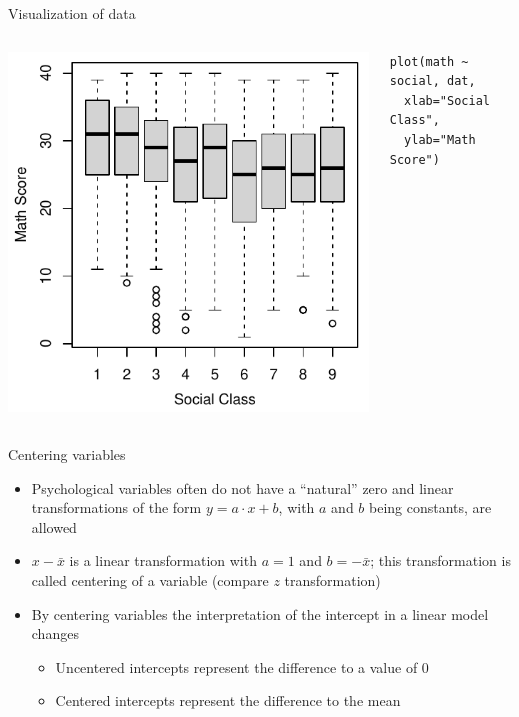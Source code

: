 \documentclass{beamer}
\begin{document}
\begin{frame}[fragile]{Visualization of data}
  \begin{columns}
    \begin{column}{6cm}
      \includegraphics[scale=.8]{../figures/jsp_box1}
    \end{column}
    \begin{column}{4cm}
      \begin{lstlisting}[style=plain]
plot(math ~ social, dat,
  xlab="Social Class",
  ylab="Math Score")
      \end{lstlisting}
    \end{column}
  \end{columns}
\end{frame}

\begin{frame}[fragile]{Centering variables}
  \begin{itemize}
    \item Psychological variables often do not have a ``natural'' zero and
      linear transformations of the form $y = a\cdot x + b$, with $a$ and
      $b$ being constants, are allowed
    \item $x - \bar x$ is a linear transformation with $a = 1$ and $b =
      -\bar x$; this transformation is called centering of a variable
      (compare $z$ transformation)
    \item By centering variables the interpretation of the intercept in a
      linear model changes
    \begin{itemize}
      \item Uncentered intercepts represent the difference to a value of 0
      \item Centered intercepts represent the difference to the mean
    \end{itemize}
  \end{itemize}
\end{frame}
\end{document}
